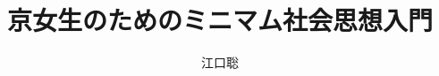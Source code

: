 \documentclass[uplatex,dvipdfmx,openany,oneside,report]{jsbook}
\author{江口聡}
\title{京女生のためのミニマム社会思想入門}
\begin{document}
\maketitle{}
\frontmatter
\tableofcontents{}


\mainmatter










% 

% 




% 

% 

  

\end{document}
